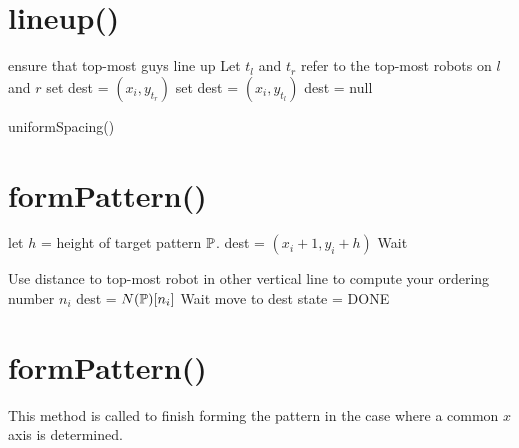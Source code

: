 \documentclass[preprint,10pt]{elsarticle}
\begin{document}
\section{lineup()} 
	\begin{algorithm}[H]
	\begin{algorithmic}[1]
		
		\Comment ensure that top-most guys line up
		\State Let $t_l$ and $t_r$ refer to the top-most robots on $l$ and $r$
			\State set dest = $(x_i, y_{t_r})$
			\State set dest = $(x_i, y_{t_l})$
		\Else 
			\State dest = null
		\EndIf

		\State uniformSpacing()
	\EndProcedure
	\end{algorithmic}
	\end{algorithm}

\section{formPattern()} 
	\begin{algorithm}[H]
	\begin{algorithmic}[1]

			\State let $h$ = height of target pattern $\mathbb{P}$.
			\State dest = $(x_i + 1, y_i + h)$
		\EndIf
			Wait
		\EndWhile

		\State Use distance to top-most robot in other vertical line to compute your 
		ordering number $n_i$
		\State dest = $N(\mathbb{P})[n_i]$
			Wait
		\EndWhile
		\State move to dest
		state = DONE

		\EndIf
	\EndProcedure
	\end{algorithmic}
	\end{algorithm}
\section{formPattern()} 
This method is called to finish forming the pattern in the case where
a common $x$ axis is determined.
\begin{algorithm}[H]
\begin{algorithmic}[1]
			
		\EndCase
	\EndSwitch
\EndProcedure
\end{algorithmic}
\end{algorithm}
\end{document}
